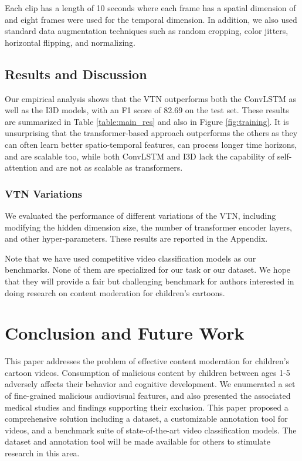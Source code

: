 \documentclass[letterpaper]{article}
\begin{document}
Each clip has a length of 10 seconds where each frame has a spatial dimension of  and eight frames were used for the temporal dimension. In addition, we also used standard data augmentation techniques such as random cropping, color jitters, horizontal flipping, and normalizing.   

\subsection{Results and Discussion}

Our empirical analysis shows that the VTN outperforms both the ConvLSTM as well as the I3D models, with an F1 score of 82.69 on the test set. These results are summarized in Table \ref{table:main_res} and also in Figure \ref{fig:training}. It is unsurprising that the transformer-based approach outperforms the others as they can often learn better spatio-temporal features, can process longer time horizons, and are scalable too, while both ConvLSTM and I3D lack the capability of self-attention and are not as scalable as transformers.  

\subsubsection{VTN Variations}
We evaluated the performance of different variations of the VTN, including modifying the hidden dimension size, the number of transformer encoder layers, and other hyper-parameters. These results are reported in the Appendix.

Note that we have used competitive video classification models as our benchmarks.  None of them are specialized for our task or our dataset.  We hope that they will provide a fair but challenging benchmark for authors interested in doing research on content moderation for children's cartoons. 


\section{Conclusion and Future Work}
This paper addresses the problem of effective content moderation for children's cartoon videos. 
 Consumption of malicious content by children between ages 1-5 adversely affects their behavior and cognitive development. We enumerated a set of fine-grained malicious audiovisual features, and also presented the associated medical studies and findings supporting their exclusion. This paper proposed a comprehensive solution including a dataset, a customizable annotation tool for videos, and a benchmark suite of state-of-the-art video classification models. The dataset and annotation tool will be made available for others to stimulate research in this area.
 
\end{document}
